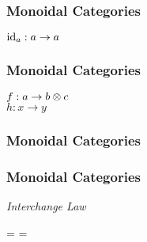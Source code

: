 \begin{frame}
    \frametitle{Monoidal Categories}

    \begin{center}
        $\operatorname{id}_a: a \to a$ \\ \vspace{0.5em}
        
    \end{center}
\end{frame}

\begin{frame}
    \frametitle{Monoidal Categories}

    \begin{center}
        $f: a \to b \otimes c$ \\
        $h: x \to y$ \\ \vspace{0.5em}
    \end{center}
\end{frame}

\begin{frame}
    \frametitle{Monoidal Categories}

    \begin{center}
    \end{center}
\end{frame}

\begin{frame}
    \frametitle{Monoidal Categories}

    \begin{center}
        \textit{Interchange Law} \\ \vspace{0.5em}
        
        = 
        = 
    \end{center}
\end{frame}


